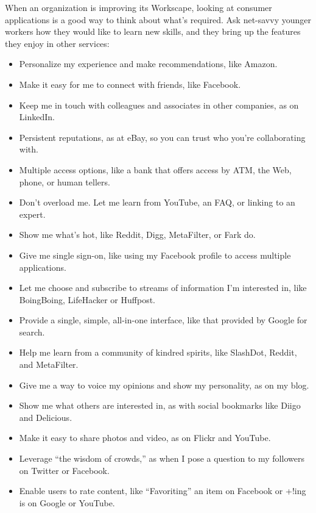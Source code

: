 When an organization is improving its Workscape, looking at consumer
applications is a good way to think about what's required. Ask net-savvy
younger workers how they would like to learn new skills, and they bring
up the features they enjoy in other services:

\begin{itemize}
\itemsep1pt\parskip0pt
\item
  Personalize my experience and make recommendations, like Amazon.
\item
  Make it easy for me to connect with friends, like Facebook.
\item
  Keep me in touch with colleagues and associates in other companies, as
  on LinkedIn.
\item
  Persistent reputations, as at eBay, so you can trust who you're
  collaborating with.
\item
  Multiple access options, like a bank that offers access by ATM, the
  Web, phone, or human tellers.
\item
  Don't overload me. Let me learn from YouTube, an FAQ, or linking to an
  expert.
\item
  Show me what's hot, like Reddit, Digg, MetaFilter, or Fark do.
\item
  Give me single sign-on, like using my Facebook profile to access
  multiple applications.
\item
  Let me choose and subscribe to streams of information I'm interested
  in, like BoingBoing, LifeHacker or Huffpost.
\item
  Provide a single, simple, all-in-one interface, like that provided by
  Google for search.
\item
  Help me learn from a community of kindred spirits, like SlashDot,
  Reddit, and MetaFilter.
\item
  Give me a way to voice my opinions and show my personality, as on my
  blog.
\item
  Show me what others are interested in, as with social bookmarks like
  Diigo and Delicious.
\item
  Make it easy to share photos and video, as on Flickr and YouTube.
\item
  Leverage ``the wisdom of crowds,'' as when I pose a question to my
  followers on Twitter or Facebook.
\item
  Enable users to rate content, like ``Favoriting'' an item on Facebook
  or +!ing is on Google or YouTube.
\end{itemize}

